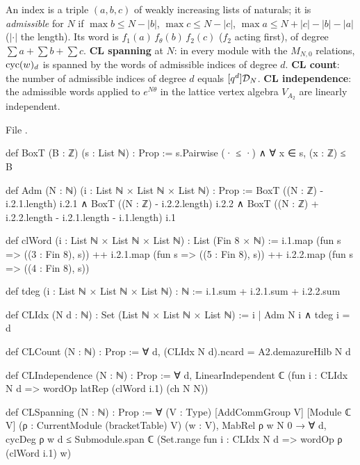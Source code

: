 \begin{definition}\label{l26:def:cl}
An index is a triple $(a,b,c)$ of weakly increasing lists of naturals; it is \emph{admissible} for $N$ if
$\max b\le N-|b|$, $\max c\le N-|c|$, $\max a\le N+|c|-|b|-|a|$ ($|\cdot|$ the length). Its word is
$f_1(a)\,f_\theta(b)\,f_2(c)$ ($f_2$ acting first), of degree $\sum a+\sum b+\sum c$. \textbf{CL spanning} at $N$: in every
module with the $M_{N,0}$ relations, $\operatorname{cyc}(w)_d$ is spanned by the words of admissible indices of degree $d$.
\textbf{CL count}: the number of admissible indices of degree $d$ equals $[q^d]\mathcal D_N$. \textbf{CL independence}:
the admissible words applied to $e^{N\theta}$ in the lattice vertex algebra $V_{A_2}$ are linearly independent.
\end{definition}
\noindent File .
\begin{leancode}
def BoxT (B : ℤ) (s : List ℕ) : Prop := s.Pairwise (· ≤ ·) ∧ ∀ x ∈ s, (x : ℤ) ≤ B

def Adm (N : ℕ) (i : List ℕ × List ℕ × List ℕ) : Prop :=
  BoxT ((N : ℤ) - i.2.1.length) i.2.1 ∧ BoxT ((N : ℤ) - i.2.2.length) i.2.2 ∧
    BoxT ((N : ℤ) + i.2.2.length - i.2.1.length - i.1.length) i.1

def clWord (i : List ℕ × List ℕ × List ℕ) : List (Fin 8 × ℕ) :=
  i.1.map (fun s => ((3 : Fin 8), s)) ++ i.2.1.map (fun s => ((5 : Fin 8), s)) ++
    i.2.2.map (fun s => ((4 : Fin 8), s))

def tdeg (i : List ℕ × List ℕ × List ℕ) : ℕ := i.1.sum + i.2.1.sum + i.2.2.sum

def CLIdx (N d : ℕ) : Set (List ℕ × List ℕ × List ℕ) := {i | Adm N i ∧ tdeg i = d}

def CLCount (N : ℕ) : Prop := ∀ d, (CLIdx N d).ncard = A2.demazureHilb N d

def CLIndependence (N : ℕ) : Prop :=
  ∀ d, LinearIndependent ℂ (fun i : CLIdx N d => wordOp latRep (clWord i.1) (ch N N))

def CLSpanning (N : ℕ) : Prop :=
  ∀ (V : Type) [AddCommGroup V] [Module ℂ V] (ρ : CurrentModule (bracketTable) V) (w : V),
    MabRel ρ w N 0 → ∀ d, cycDeg ρ w d ≤
      Submodule.span ℂ (Set.range fun i : CLIdx N d => wordOp ρ (clWord i.1) w)
\end{leancode}

